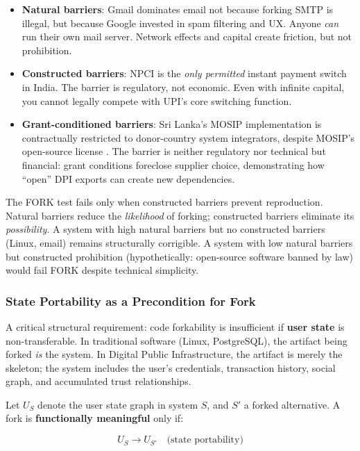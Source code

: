 \documentclass{article}
\begin{document}
\begin{itemize}
    \item \textbf{Natural barriers}: Gmail dominates email not because forking SMTP is illegal, but because Google invested in spam filtering and UX. Anyone \textit{can} run their own mail server. Network effects and capital create friction, but not prohibition.
    \item \textbf{Constructed barriers}: NPCI is the \textit{only permitted} instant payment switch in India. The barrier is regulatory, not economic. Even with infinite capital, you cannot legally compete with UPI's core switching function.
    \item \textbf{Grant-conditioned barriers}: Sri Lanka's MOSIP implementation is contractually restricted to donor-country system integrators, despite MOSIP's open-source license \citep{biometricupdate2025}. The barrier is neither regulatory nor technical but financial: grant conditions foreclose supplier choice, demonstrating how ``open'' DPI exports can create new dependencies.
\end{itemize}

The FORK test fails only when constructed barriers prevent reproduction. Natural barriers reduce the \textit{likelihood} of forking; constructed barriers eliminate its \textit{possibility}. A system with high natural barriers but no constructed barriers (Linux, email) remains structurally corrigible. A system with low natural barriers but constructed prohibition (hypothetically: open-source software banned by law) would fail FORK despite technical simplicity.

\subsubsection{State Portability as a Precondition for Fork}

A critical structural requirement: code forkability is insufficient if \textbf{user state} is non-transferable. In traditional software (Linux, PostgreSQL), the artifact being forked \textit{is} the system. In Digital Public Infrastructure, the artifact is merely the skeleton; the system includes the user's credentials, transaction history, social graph, and accumulated trust relationships.

Let $U_S$ denote the user state graph in system $S$, and $S'$ a forked alternative. A fork is \textbf{functionally meaningful} only if:

\begin{equation}
U_S \to U_{S'} \quad \text{(state portability)}
\label{eq:state-portability}
\end{equation}
\end{document}
